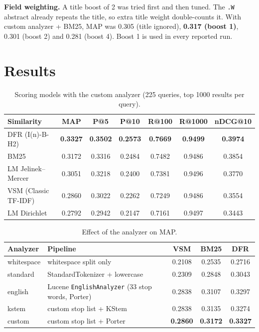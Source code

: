 \documentclass[10pt,a4paper]{article}
\newcommand{\code}[1]{\texttt{\small #1}}
\begin{document}
\textbf{Field weighting.} A title boost of 2 was tried first and then tuned. The \code{.W}
abstract already repeats the title, so extra title weight double-counts it. With custom
analyzer + BM25, MAP was 0.305 (title ignored), \textbf{0.317 (boost 1)}, 0.301 (boost 2) and
0.281 (boost 4). Boost 1 is used in every reported run.

\section{Results}

\begin{table}[h]
\centering\small
\caption{Scoring models with the custom analyzer (225 queries, top 1000 results per query).}
\label{tab:sims}
\begin{tabular}{lcccccc}
\toprule
Similarity & MAP & P@5 & P@10 & R@100 & R@1000 & nDCG@10\\
\midrule
DFR (I(n)-B-H2)            & \textbf{0.3327} & \textbf{0.3502} & \textbf{0.2573} & \textbf{0.7669} & \textbf{0.9499} & \textbf{0.3974}\\
BM25                       & 0.3172 & 0.3316 & 0.2484 & 0.7482 & 0.9486 & 0.3854\\
LM Jelinek--Mercer         & 0.3051 & 0.3218 & 0.2400 & 0.7381 & 0.9496 & 0.3770\\
VSM (Classic TF-IDF)       & 0.2860 & 0.3022 & 0.2262 & 0.7249 & 0.9486 & 0.3554\\
LM Dirichlet               & 0.2792 & 0.2942 & 0.2147 & 0.7161 & 0.9497 & 0.3443\\
\bottomrule
\end{tabular}
\end{table}

\begin{table}[h]
\centering\small
\caption{Effect of the analyzer on MAP.}
\label{tab:analyzers}
\begin{tabular}{llccc}
\toprule
Analyzer & Pipeline & VSM & BM25 & DFR\\
\midrule
whitespace & whitespace split only                         & 0.2108 & 0.2535 & 0.2716\\
standard   & StandardTokenizer + lowercase                 & 0.2309 & 0.2848 & 0.3043\\
english    & Lucene \code{EnglishAnalyzer} (33 stop words, Porter) & 0.2838 & 0.3107 & 0.3297\\
kstem      & custom stop list + KStem                      & 0.2838 & 0.3135 & 0.3274\\
custom     & custom stop list + Porter                     & \textbf{0.2860} & \textbf{0.3172} & \textbf{0.3327}\\
\bottomrule
\end{tabular}
\end{table}
\end{document}
